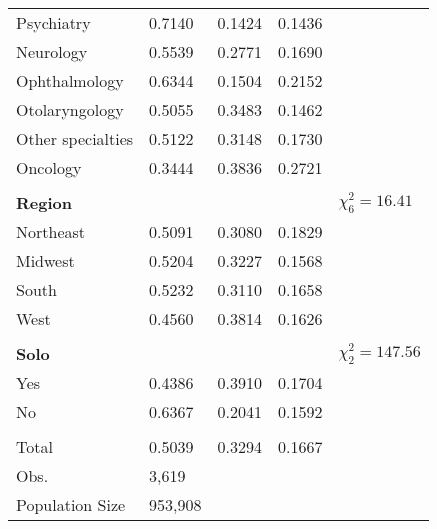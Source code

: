\documentclass[11pt, oneside]{article}        %
\begin{document}
\begin{table}[h]
\begin{tabular}{@{}lllll@{}}
Psychiatry                             & 0.7140   & 0.1424     & 0.1436     &                        \\
Neurology                              & 0.5539   & 0.2771     & 0.1690     &                        \\
Ophthalmology                          & 0.6344   & 0.1504     & 0.2152     &                        \\
Otolaryngology                         & 0.5055   & 0.3483     & 0.1462     &                        \\
Other specialties                      & 0.5122   & 0.3148     & 0.1730     &                        \\
Oncology                               & 0.3444   & 0.3836     & 0.2721     &                        \\
                                       &          &            &            &                        \\
\textbf{Region}                        &          &            &            & $\chi^2_6 = 16.41$     \\
Northeast                              & 0.5091   & 0.3080     & 0.1829     &                        \\
Midwest                                & 0.5204   & 0.3227     & 0.1568     &                        \\
South                                  & 0.5232   & 0.3110     & 0.1658     &                        \\
West                                   & 0.4560   & 0.3814     & 0.1626     &                        \\
                                       &          &            &            &                        \\
\textbf{Solo}                          &          &            &            & $\chi^2_2 = 147.56$    \\
Yes                                    & 0.4386   & 0.3910     & 0.1704     &                        \\
No                                     & 0.6367   & 0.2041     & 0.1592     &                        \\
                                       &          &            &            &                        \\
Total                                  & 0.5039   & 0.3294     & 0.1667     &                        \\
Obs.                                   & 3,619    &            &            &                        \\
Population Size                        & 953,908  &            &            &                        \\ \bottomrule
\end{tabular}
\end{table}
\end{document}
